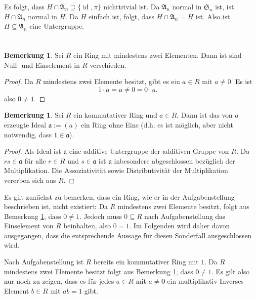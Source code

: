 \documentclass[a4paper,10pt]{article}
\theoremstyle{definition}
\newtheorem{bem}[beh]{Bemerkung}
\newcommand{\Sn}{\mathfrak{S}}
\newcommand{\mf}[1]{\mathfrak{#1}}
\newcommand{\id}{\operatorname{id}}
\begin{document}
Es folgt, dass $H \cap \mf{A}_n \supseteq \{\id, \pi\}$ nichttrivial ist. Da $\mf{A}_n$ normal in $\Sn_n$ ist, ist $H \cap \mf{A}_n$ normal in $H$. Da $H$ einfach ist, folgt, dass $H \cap \mf{A}_n = H$ ist. Also ist $H \subseteq \mf{A}_n$ eine Untergruppe.





\section{}

\begin{bem}\label{bem: 0 neq 1}
 Sei $R$ ein Ring mit mindestens zwei Elementen. Dann ist sind Null- und Einselement in $R$ verschieden.
\end{bem}
\begin{proof}
 Da $R$ mindestens zwei Elemente besitzt, gibt es ein $a \in R$ mit $a \neq 0$. Es ist
 \[
  1 \cdot a = a \neq 0 = 0 \cdot a,
 \]
 also $0 \neq 1$.
\end{proof}

\begin{bem}\label{bem: ideal ring ohne null}
 Sei $R$ ein kommutativer Ring und $a \in R$. Dann ist das von $a$ erzeugte Ideal $\mf{a} := (a)$ ein Ring ohne Eins (d.h. es ist möglich, aber nicht notwendig, dass $1 \in \mf{a}$).
\end{bem}
\begin{proof}
 Als Ideal ist $\mf{a}$ eine additive Untergruppe der additiven Gruppe von $R$. Da $rs \in \mf{a}$ für alle $r \in R$ und $s \in \mf{a}$ ist $\mf{a}$ inbesondere abgeschlossen bezüglich der Multiplikation. Die Assoziativität sowie Distributivität der Multiplikation vererben sich aus $R$.
\end{proof}

Es gilt zunächst zu bemerken, dass ein Ring, wie er in der Aufgabenstellung beschrieben ist, nicht existiert: Da $R$ mindestens zwei Elemente besitzt, folgt aus Bemerkung \ref{bem: 0 neq 1}, dass $0 \neq 1$. Jedoch muss $0 \subseteq R$ nach Aufgabenstellung das Einselement von $R$ beinhalten, also $0 = 1$. Im Folgenden wird daher davon ausgegangen, dass die entsprechende Aussage für diesen Sonderfall ausgeschlossen wird.

Nach Aufgabenstellung ist $R$ bereits ein kommutativer Ring mit $1$. Da $R$ mindestens zwei Elemente besitzt folgt aus Bemerkung \ref{bem: 0 neq 1}, dass $0 \neq 1$. Es gilt also nur noch zu zeigen, dass es für jedes $a \in R$ mit $a \neq 0$ ein multiplikativ Inverses Element $b \in R$ mit $ab = 1$ gibt.
\end{document}
